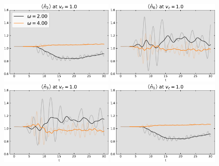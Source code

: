 \begin{figure}[!hbt]
    \begin{minipage}[b]{.49\textwidth}
                \centering
                \includegraphics[trim=0 0 0 -4, clip, width=0.49\textwidth]{graph/occupation/occupation_site_2_vc_10.pdf}
                \includegraphics[trim=0 0 0 -4, clip, width=0.49\textwidth]{graph/occupation/occupation_site_0_vc_10.pdf}
                \includegraphics[trim=0 0 0 -4, clip, width=0.49\textwidth]{graph/occupation/occupation_site_3_vc_10.pdf}
                \includegraphics[trim=0 0 0 -4, clip, width=0.49\textwidth]{graph/occupation/occupation_site_1_vc_10.pdf}

\end{minipage}
\end{figure}
